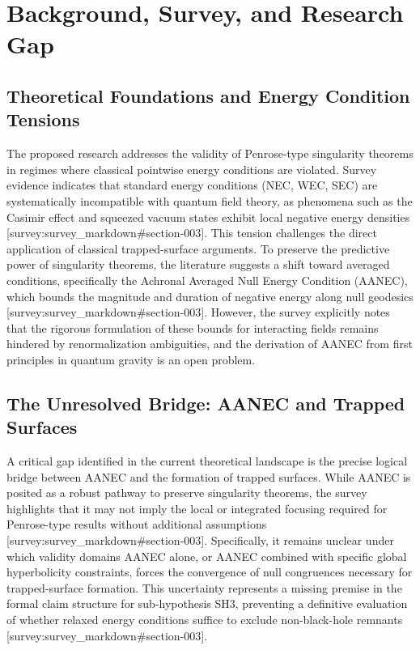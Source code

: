 \documentclass[conference]{IEEEtran}
\begin{document}
\section{Background, Survey, and Research Gap}
\subsection{Theoretical Foundations and Energy Condition Tensions}
The proposed research addresses the validity of Penrose-type singularity theorems in regimes where classical pointwise energy conditions are violated. Survey evidence indicates that standard energy conditions (NEC, WEC, SEC) are systematically incompatible with quantum field theory, as phenomena such as the Casimir effect and squeezed vacuum states exhibit local negative energy densities [survey:survey\_markdown\#section-003]. This tension challenges the direct application of classical trapped-surface arguments. To preserve the predictive power of singularity theorems, the literature suggests a shift toward averaged conditions, specifically the Achronal Averaged Null Energy Condition (AANEC), which bounds the magnitude and duration of negative energy along null geodesics [survey:survey\_markdown\#section-003]. However, the survey explicitly notes that the rigorous formulation of these bounds for interacting fields remains hindered by renormalization ambiguities, and the derivation of AANEC from first principles in quantum gravity is an open problem.~\cite{cite_0ed84243cf171bc4}

\subsection{The Unresolved Bridge: AANEC and Trapped Surfaces}
A critical gap identified in the current theoretical landscape is the precise logical bridge between AANEC and the formation of trapped surfaces. While AANEC is posited as a robust pathway to preserve singularity theorems, the survey highlights that it may not imply the local or integrated focusing required for Penrose-type results without additional assumptions [survey:survey\_markdown\#section-003]. Specifically, it remains unclear under which validity domains AANEC alone, or AANEC combined with specific global hyperbolicity constraints, forces the convergence of null congruences necessary for trapped-surface formation. This uncertainty represents a missing premise in the formal claim structure for sub-hypothesis SH3, preventing a definitive evaluation of whether relaxed energy conditions suffice to exclude non-black-hole remnants [survey:survey\_markdown\#section-003].
\end{document}
